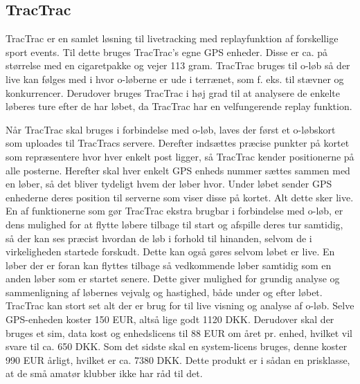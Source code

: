 \subsection{TracTrac}
TracTrac er en samlet løsning til livetracking med replayfunktion af forskellige sport events. Til dette bruges TracTrac's egne GPS enheder. Disse er ca. på størrelse med en cigaretpakke og vejer 113 gram.\newline
TracTrac bruges til o-løb så der live kan følges med i hvor o-løberne er ude i terrænet, som f. eks. til stævner og konkurrencer. Derudover bruges TracTrac i høj grad til at analysere de enkelte løberes ture efter de har løbet, da TracTrac har en velfungerende replay funktion. 

Når TracTrac skal bruges i forbindelse med o-løb, laves der først et o-løbskort som uploades til TracTracs servere. Derefter indsættes præcise punkter på kortet som repræsentere hvor hver enkelt post ligger, så TracTrac kender positionerne på alle posterne. Herefter skal hver enkelt GPS enheds nummer sættes sammen med en løber, så det bliver tydeligt hvem der løber hvor. Under løbet sender GPS enhederne deres position til serverne som viser disse på kortet. Alt dette sker live. En af funktionerne som gør TracTrac ekstra brugbar i forbindelse med o-løb, er dens mulighed for at flytte løbere tilbage til start og afspille deres tur samtidig, så der kan ses præcist hvordan de løb i forhold til hinanden, selvom de i virkeligheden startede forskudt. Dette kan også gøres selvom løbet er live. En løber der er foran kan flyttes tilbage så vedkommende løber samtidig som en anden løber som er startet senere. Dette giver mulighed for grundig analyse og sammenligning af løbernes vejvalg og hastighed, både under og efter løbet.\newline
TracTrac kan stort set alt der er brug for til live visning og analyse af o-løb. Selve GPS-enheden koster 150 EUR, altså lige godt 1120 DKK. Derudover skal der bruges et sim, data kost og enhedslicens til 88 EUR om året pr. enhed, hvilket vil svare til ca. 650 DKK. Som det sidste skal en system-licens bruges, denne koster 990 EUR årligt, hvilket er ca. 7380 DKK. Dette produkt er i sådan en prisklasse, at de små amatør klubber ikke har råd til det. \citep{TTC}


